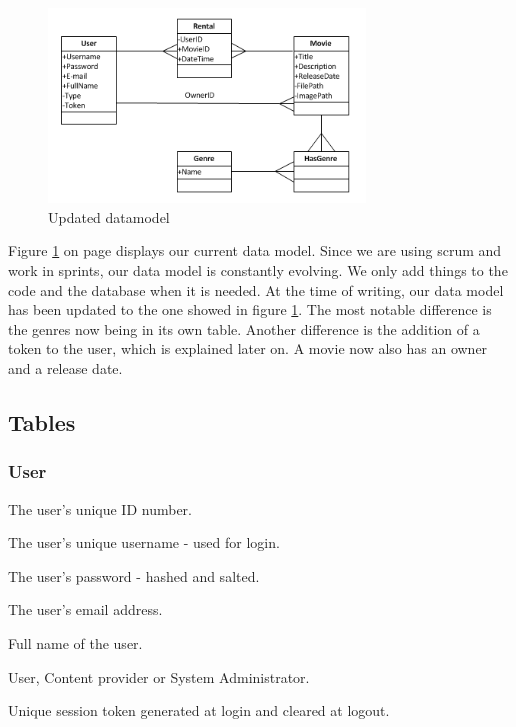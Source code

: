 \begin{figure}[h!]
  \centering
    \includegraphics[width=0.75\textwidth]{Images/Datamodel_Updated}
  \caption{Updated datamodel}
  \label{fig:Design_Database_updated}
\end{figure}

Figure \ref{fig:Design_Database_updated} on page \pageref{fig:Design_Database_updated} displays our current data model. Since we are using scrum and work in sprints, our data model is constantly evolving. We only add things to the code and the database when it is needed. At the time of writing, our data model has been updated to the one showed in figure \ref{fig:Design_Database_updated}. The most notable difference is the genres now being in its own table. Another difference is the addition of a token to the user, which is explained later on. A movie now also has an owner and a release date.

\subsection{Tables}
\label{Design_Database_Tables}

\subsubsection{User}
\label{Design_Database_Tables_User}

\begin{description}\addtolength{\itemsep}{-7pt}
\item[user\_id] The user's unique ID number.
\item[username] The user's unique username - used for login.
\item[password] The user's password - hashed and salted.
\item[email] The user's email address.
\item[full\_name] Full name of the user.
\item[type] User, Content provider or System Administrator.
\item[token] Unique session token generated at login and cleared at logout.
\end{description}

